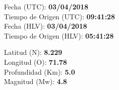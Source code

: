 \begin{multicols}{2}
\begin{large}\begin{flushright}
\textsf{Fecha (UTC): \textbf{03/04/2018} \vspace{0.1cm} \\ 
Tiempo de Origen (UTC): \textbf{09:41:28} \vspace{0.1cm} \\ 
Fecha (HLV): \textbf{03/04/2018} \vspace{0.1cm} \\ 
Tiempo de Origen (HLV): \textbf{05:41:28} } 
\end{flushright}
\begin{flushleft}
\textsf{Latitud (\textdegree N):  \textbf{8.229} \vspace{0.1cm} \\ 
Longitud (\textdegree O): \textbf{71.78} \vspace{0.1cm} \\ 
Profundidad (Km): \textbf{5.0} \vspace{0.1cm} \\ 
Magnitud (Mw): \textbf{4.8}}  \\ 
\end{flushleft}
\end{large}\end{multicols}
